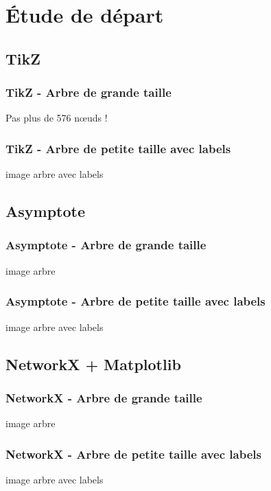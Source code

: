 \section{Étude de départ}

\subsection{TikZ}

\begin{frame}
	\frametitle{TikZ - Arbre de grande taille}
	Pas plus de 576 n\oe uds !
\end{frame}

\begin{frame}
	\frametitle{TikZ - Arbre de petite taille avec labels}
	image arbre avec labels
\end{frame}

\subsection{Asymptote}

\begin{frame}
	\frametitle{Asymptote - Arbre de grande taille}
	image arbre
\end{frame}

\begin{frame}
	\frametitle{Asymptote - Arbre de petite taille avec labels}
	image arbre avec labels
\end{frame}

\subsection{NetworkX + Matplotlib}

\begin{frame}
	\frametitle{NetworkX - Arbre de grande taille}
	image arbre
\end{frame}

\begin{frame}
	\frametitle{NetworkX - Arbre de petite taille avec labels}
	image arbre avec labels
\end{frame}


